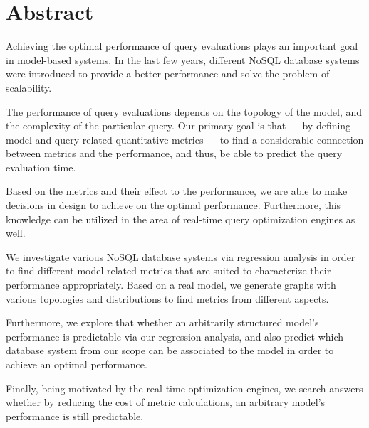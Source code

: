 \vfill
{}
\englishParagraph


\chapter*{Abstract}
Achieving the optimal performance of query evaluations plays an important goal in model-based systems. In the last few years, different NoSQL database systems were introduced to provide a better performance and solve the problem of scalability.

The performance of query evaluations depends on the topology of the model, and the complexity of the particular query. Our primary goal is that --- by defining model and query-related quantitative metrics ---  to find a considerable connection between metrics and the performance, and thus, be able to predict the query evaluation time.

Based on the metrics and their effect to the performance, we are able to make decisions in design to achieve on the optimal performance. Furthermore, this knowledge can be utilized in the area of real-time query optimization engines as well.

We investigate various NoSQL database systems via regression analysis in order to find different model-related metrics that are suited to characterize their performance appropriately. Based on a real model, we generate graphs with various topologies and distributions to find metrics from different aspects.

Furthermore, we explore that whether an arbitrarily structured model's performance is predictable via our regression analysis, and also predict which database system from our scope can be associated to the model in order to achieve an optimal performance.

Finally, being motivated by the real-time optimization engines, we search answers whether by reducing the cost of metric calculations, an arbitrary model's performance is still predictable.


\vfill
\dolgozatnyelve
{}

\setcounter{romanPage}{\value{page}}
